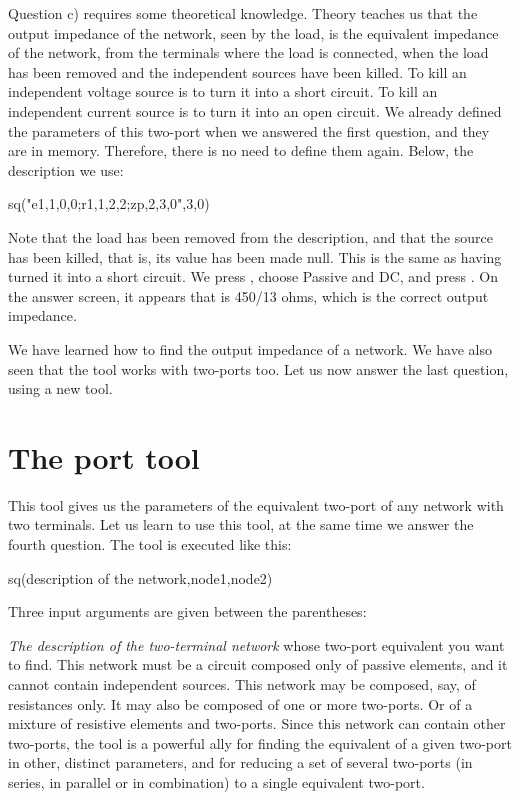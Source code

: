 Question c) requires some theoretical knowledge. Theory teaches us
that the output impedance of the network, seen by the load, is the
equivalent impedance of the network, from the terminals where the
load is connected, when the load has been removed and the
independent sources have been killed. To kill an independent voltage
source is to turn it into a short circuit. To kill an independent
current source is to turn it into an open circuit. We already
defined the parameters of this two-port when we answered the first
question, and they are in memory. Therefore, there is no need to
define them again. Below, the description we use:

\begin{entry}
sq\thevenin("e1,1,0,0;r1,1,2,2;zp,2,3,0",3,0)
\end{entry}

Note that the load has been removed from the description, and that
the source has been killed, that is, its value has been made null.
This is the same as having turned it into a short circuit. We press
, choose Passive and DC, and press . On the
answer screen, it appears that  is 450/13 ohms, which is
the correct output impedance.

We have learned how to find the output impedance of a network. We
have also seen that the  tool works with two-ports
too. Let us now answer the last question, using a new tool.

\section{The port tool}

This tool gives us the parameters of the equivalent two-port of any
network with two terminals. Let us learn to use this tool, at the
same time we answer the fourth question. The  tool is
executed like this:

\begin{entry}
sq\port(description of the network,node1,node2)
\end{entry}

Three input arguments are given between the parentheses:

\emph{The description of the two-terminal network} whose two-port
equivalent you want to find. This network must be a circuit composed
only of passive elements, and it cannot contain independent sources.
This network may be composed, say, of resistances only. It may also
be composed of one or more two-ports. Or of a mixture of resistive
elements and two-ports. Since this network can contain other
two-ports, the  tool is a powerful ally for finding the
equivalent of a given two-port in other, distinct parameters, and
for reducing a set of several two-ports (in series, in parallel or
in combination) to a single equivalent two-port.

